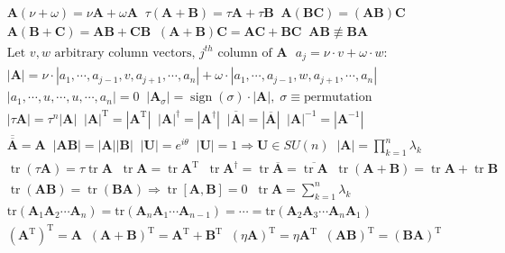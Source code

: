  \begin{align*}
 &\mathbf{A}(\nu\!+\!\omega)\!=\!\nu\mathbf{A}\!+\!\omega\mathbf{A}\;\;\tau(\mathbf{A}\!+\!\mathbf{B})\!=\!\tau\mathbf{A}\!+\!\tau\mathbf{B}\;\;\mathbf{A(BC)\!=\!(AB)C} \\ &\mathbf{A(B\!+\!C)\!=\!AB\!+\!CB}\;\;\mathbf{(A\!+\!B)C\!=\!AC\!+\!BC}\;\;\mathbf{AB\!\not\equiv\! BA} \\
&\text{Let }v,w\text{ arbitrary column vectors, $j^{th}$ column of $\mathbf{A}$ }a_j\!=\!\nu\!\cdot\!v\!+\!\omega\!\cdot\!w: \\
&|\mathbf{A}|\!=\!\nu\!\cdot\!|a_1,\cdots,a_{j-1},v,a_{j+1},\cdots,a_n|\!+\!\omega\!\cdot\!|a_1,\cdots,a_{j-1},w,a_{j+1},\cdots,a_n| \\
&|a_1,\cdots,u,\cdots,u,\cdots,a_n|\!=\!0\;\;|\mathbf{A}_\sigma|\!=\!\operatorname{sign}(\sigma)\!\cdot\!|\mathbf{A}|,\;\sigma\!\equiv\!\text{permutation} \\
&|\tau\mathbf{A}|\!=\!\tau^n|\mathbf{A}|\;\;|\mathbf{A}|^{\operatorname{T}}\!=\!|\mathbf{A}^{\operatorname{T}}|\;\;|\mathbf{A}|^\dagger\!=\!|\mathbf{A}^\dagger|\;\;\overline{|\mathbf{A}|}\!=\!|\overline{\mathbf{A}}|\;\;|\mathbf{A}|^{-1}\!=\!|\mathbf{A}^{-1}| \\
&\overline{\overline{\mathbf{A}}}\!=\!\mathbf{A}\;\;|\mathbf{AB}|\!=\!|\mathbf{A}||\mathbf{B}|\;\;|\mathbf{U}|\!=\!e^{i\theta}\;\;|\mathbf{U}|\!=\!1\Rightarrow\mathbf{U}\!\in\!SU(n)\;\;|\mathbf{A}|\!=\!\prod\nolimits_{k=1}^n\lambda_k\\
&\operatorname{tr}(\tau\mathbf{A})\!=\!\tau\operatorname{tr}\mathbf{A}\;\;\operatorname{tr}\mathbf{A}\!=\!\operatorname{tr}\mathbf{A}^{\operatorname{T}}\;\;\operatorname{tr}\mathbf{A}^\dagger\!=\!\operatorname{tr}\overline{\mathbf{A}}\!=\!\overline{\operatorname{tr}\mathbf{A}}\;\;\operatorname{tr}(\mathbf{A\!+\!B})\!=\!\operatorname{tr}\mathbf{A}\!+\!\operatorname{tr}\mathbf{B} \\
&\operatorname{tr}(\mathbf{AB})\!=\!\operatorname{tr}(\mathbf{BA})\Rightarrow\operatorname{tr}[\mathbf{A},\mathbf{B}]\!=\!0\;\;\operatorname{tr}\mathbf{A}\!=\!\sum\nolimits_{k=1}^n\lambda_k \\
&\mathrm{tr}(\mathbf{A}_1\mathbf{A}_2\cdots\mathbf{A}_n)\!=\!\mathrm{tr}(\mathbf{A}_n\mathbf{A}_1\cdots\mathbf{A}_{n-1})\!=\!\cdots\!=\!\mathrm{tr}(\mathbf{A}_2\mathbf{A}_3\cdots\mathbf{A}_n\mathbf{A}_1) \\
&(\mathbf{A}^{\operatorname{T}})^{\operatorname{T}}\!=\!\mathbf{A}\;\;(\mathbf{A\!+\!B})^{\operatorname{T}}\!=\!\mathbf{A}^{\operatorname{T}}\!+\!\mathbf{B}^{\operatorname{T}}\;\;(\eta\mathbf{A})^{\operatorname{T}}\!=\!\eta\mathbf{A}^{\operatorname{T}}\;\;(\mathbf{AB})^{\operatorname{T}}\!=\!(\mathbf{BA})^{\operatorname{T}} \\

\end{align*}
